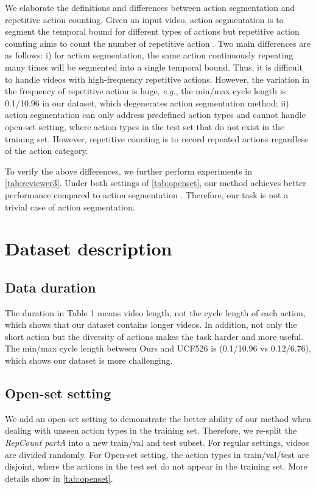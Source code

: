 \documentclass[10pt,twocolumn,letterpaper]{article}
\begin{document}
We elaborate the definitions and differences between action segmentation and repetitive action counting. Given an input video, action segmentation is to segment the temporal bound for different types of actions but repetitive action counting aims to count the number of repetitive action \cite{RepNet,Zhang_2020_CVPR}. Two main differences are as follows: i) for action segmentation, the same action continuously repeating many times will be segmented into a single temporal bound. Thus, it is difficult to handle videos with high-frequency repetitive actions. However, the variation in the frequency of repetitive action is huge, \emph{e.g.}, the min/max cycle length is 0.1/10.96 in our dataset, which degenerates action segmentation method; ii) action segmentation can only address predefined action types and cannot handle open-set setting, where action types in the test set that do not exist in the training set. However, repetitive counting is to record repeated actions regardless of the action category. 

To verify the above differences, we further perform experiments in \cref{tab:reviewer3}. Under both settings of \cref{tab:openset}, our method achieves better performance  compared to action segmentation \cite{huang2020improving}. Therefore, our task is not a trivial case of action segmentation.






\section{Dataset description}
\subsection{Data duration}
The duration in Table 1 means video length, not the cycle length of each action, which shows that our dataset contains longer videos. In addition, not only the short action but the diversity of actions makes the task harder and more useful. The min/max cycle length between Ours and UCF526\cite{Zhang_2020_CVPR} is (0.1/10.96 vs 0.12/6.76), which shows our dataset is more challenging. 

\subsection{Open-set setting}

We add an open-set setting to demonstrate the better ability of our method when dealing with unseen action types in the training set. Therefore, we re-split the \emph{RepCount partA} into a new train/val and test subset. For regular settings, videos are divided randomly. For Open-set setting, the action types in train/val/test are disjoint, where the actions in the test set do not appear in the training set. More details show in \cref{tab:openset}.
\end{document}
